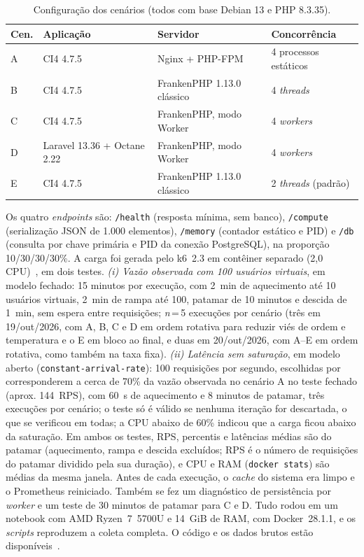\documentclass[sigconf, nonacm, screen, anonymous, language=portuguese, language=spanish, language={main=english}]{acmart}
\begin{document}
\begin{table}[htb]
  \caption{Configuração dos cenários (todos com base Debian 13 e PHP 8.3.35).}
  \label{tab:config}
  \centering
  \footnotesize
  \setlength{\tabcolsep}{3pt}
  \begin{tabular}{llll}
    \toprule
    \textbf{Cen.} & \textbf{Aplicação} & \textbf{Servidor} & \textbf{Concorrência} \\
    \midrule
    A & CI4 4.7.5 & Nginx + PHP-FPM & 4 processos estáticos \\
    B & CI4 4.7.5 & FrankenPHP 1.13.0 clássico & 4 \textit{threads} \\
    C & CI4 4.7.5 & FrankenPHP, modo Worker & 4 \textit{workers} \\
    D & Laravel 13.36 + Octane 2.22 & FrankenPHP, modo Worker & 4 \textit{workers} \\
    E & CI4 4.7.5 & FrankenPHP 1.13.0 clássico & 2 \textit{threads} (padrão) \\
    \bottomrule
  \end{tabular}
\end{table}

Os quatro \textit{endpoints} são: \texttt{/health} (resposta mínima, sem banco), \texttt{/compute} (serialização JSON de 1.000 elementos), \texttt{/memory} (contador estático e PID) e \texttt{/db} (consulta por chave primária e PID da conexão PostgreSQL), na proporção 10/30/30/30\%. A carga foi gerada pelo k6~2.3 em contêiner separado (2,0 CPU)~\cite{grafana2024}, em dois testes. \emph{(i) Vazão observada com 100 usuários virtuais}, em modelo fechado: 15 minutos por execução, com 2~min de aquecimento até 10 usuários virtuais, 2~min de rampa até 100, patamar de 10 minutos e descida de 1~min, sem espera entre requisições; \emph{n}\,=\,5 execuções por cenário (três em 19/out/2026, com A, B, C e D em ordem rotativa para reduzir viés de ordem e temperatura e o E em bloco ao final, e duas em 20/out/2026, com A--E em ordem rotativa, como também na taxa fixa). \emph{(ii) Latência sem saturação}, em modelo aberto (\texttt{constant-arrival-rate}): 100 requisições por segundo, escolhidas por corresponderem a cerca de 70\% da vazão observada no cenário A no teste fechado (aprox. 144~RPS), com 60~s de aquecimento e 8 minutos de patamar, três execuções por cenário; o teste só é válido se nenhuma iteração for descartada, o que se verificou em todas; a CPU abaixo de 60\% indicou que a carga ficou abaixo da saturação. Em ambos os testes, RPS, percentis e latências médias são do patamar (aquecimento, rampa e descida excluídos; RPS é o número de requisições do patamar dividido pela sua duração), e CPU e RAM (\texttt{docker stats}) são médias da mesma janela. Antes de cada execução, o \textit{cache} do sistema era limpo e o Prometheus reiniciado. Também se fez um diagnóstico de persistência por \textit{worker} e um teste de 30 minutos de patamar para C e D. Tudo rodou em um notebook com AMD Ryzen~7~5700U e 14~GiB de RAM, com Docker~28.1.1, e os \textit{scripts} reproduzem a coleta completa. O código e os dados brutos estão disponíveis~\cite{cotb_benchmark_2026}.
\end{document}
